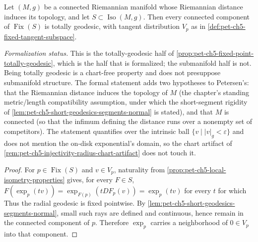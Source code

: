 \begin{proposition}
  \label{prop:pet-ch5-fixed-point-component-totally-geodesic}


  Let $(M,g)$ be a connected Riemannian manifold whose Riemannian distance induces
  its topology, and let $S\subset\operatorname{Iso}(M,g)$. Then every connected
  component of $\operatorname{Fix}(S)$ is totally geodesic, with tangent
  distribution $V_p$ as in \cref{def:pet-ch5-fixed-tangent-subspace}.

  \emph{Formalization status.} This is the totally-geodesic half of
  \cref{prop:pet-ch5-fixed-point-totally-geodesic}, which is the half that is
  formalized; the submanifold half is not. Being totally geodesic is a chart-free
  property and does not presuppose submanifold structure. The formal statement adds
  two hypotheses to Petersen's: that the Riemannian distance induces the topology
  of $M$ (the chapter's standing metric/length compatibility assumption, under
  which the short-segment rigidity of
  \cref{lem:pet-ch5-short-geodesics-segments-normal} is stated), and that $M$ is
  connected (so that the infimum defining the distance runs over a nonempty set of
  competitors). The statement quantifies over the intrinsic ball
  $\{v\mid|v|_g<\varepsilon\}$ and does not mention the on-disk exponential's
  domain, so the chart artifact of
  \cref{rem:pet-ch5-injectivity-radius-chart-artifact} does not touch it.
\end{proposition}
\begin{proof}

  \sketch
  For $p\in\operatorname{Fix}(S)$ and $v\in V_p$, naturality from
  \cref{prop:pet-ch5-local-isometry-properties} gives, for every $F\in S$,
  $F(\exp_p(tv))=\exp_{F(p)}(tDF_p(v))=\exp_p(tv)$ for every $t$ for which
  Thus the radial geodesic is fixed pointwise.  By
  \cref{lem:pet-ch5-short-geodesics-segments-normal}, small such rays are defined
  and continuous, hence remain in the connected component of $p$.  Therefore
  $\exp_p$ carries a neighborhood of $0\in V_p$ into that component.
\end{proof}

